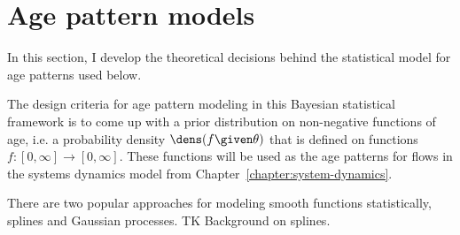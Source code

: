 \section{Age pattern models}

In this section, I develop the theoretical decisions behind the
statistical model for age patterns used below.

The design criteria for age pattern modeling in this Bayesian
statistical framework is to come up with a prior distribution on
non-negative functions of age, i.e. a probability density
$\dens(f\given\theta)$ that is defined on functions
$f:[0,\infty]\rightarrow[0,\infty]$.  These functions will be used as
the age patterns for flows in the systems dynamics model from
Chapter~\ref{chapter:system-dynamics}.

There are two popular approaches for modeling smooth functions
statistically, splines and Gaussian processes. TK Background on
splines.


